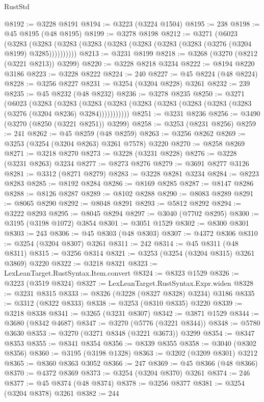 \begin{lexlean}{RustStd}
\begin{coremodule}
@8192 := @3228 @8191
@8194 := @3223 (@3224 @1504)
@8195 := 238
@8198 := @45 @8195 (@48 @8195)
@8199 := @3278 @8198
@8212 := @3271
    (@6023
      (@3283 (@3283 (@3283 (@3283 (@3283 (@3283 (@3283 (@3283 (@3276 (@3204 @8199) @3285))))))))))
@8213 := @3231 @8199
@8218 := @3268 (@3270 (@8212 (@3221 @8213)) @3299)
@8220 := @3228 @8218 @3234
@8222 := @8194 @8220 @3186
@8223 := @3228 @8222
@8224 := 240
@8227 := @45 @8224 (@48 @8224)
@8228 := @3256 @8227
@8231 := @3254 (@3204 @8228) @3261
@8232 := 239
@8235 := @45 @8232 (@48 @8232)
@8236 := @3278 @8235
@8250 := @3271
    (@6023
      (@3283
        (@3283
          (@3283 (@3283 (@3283 (@3283 (@3283 (@3283 (@3283 (@3276 (@3204 @8236) @3284)))))))))))
@8251 := @3231 @8236
@8256 := @3490 (@3270 (@8250 (@3221 @8251)) @3299)
@8258 := @3253 (@8231 @8256)
@8259 := 241
@8262 := @45 @8259 (@48 @8259)
@8263 := @3256 @8262
@8269 := @3253 (@3254 (@3204 @8263) @3261 @7578) @3220
@8270 := @8258 @8269
@8271 := @3218 @8270
@8273 := @3228 (@3231 @8228)
@8276 := @3228 (@3231 @8263) @3234
@8277 := @8273 @8276
@8279 := @3691 @8277 @3126
@8281 := @3312 (@8271 @8279)
@8283 := @3228 @8281 @3234
@8284 := @8223 @8283
@8285 := @8192 @8284
@8286 := @8169 @8285
@8287 := @8147 @8286
@8288 := @8126 @8287
@8289 := @8102 @8288
@8290 := @8083 @8289
@8291 := @8065 @8290
@8292 := @8048 @8291
@8293 := @5812 @8292
@8294 := @3222 @8293
@8295 := @8045 @8294
@8297 := @3040 (@7702 @8295)
@8300 := @3195 (@3198 @1072) @3854
@8301 := @3051 @1529
@8302 := @8300 @8301
@8303 := 243
@8306 := @45 @8303 (@48 @8303)
@8307 := @4372 @8306
@8310 := @3254 (@3204 @8307) @3261
@8311 := 242
@8314 := @45 @8311 (@48 @8311)
@8315 := @3256 @8314
@8321 := @3253 (@3254 (@3204 @8315) @3261 @3869) @3220
@8322 := @3218 @8321
@8323 := LexLeanTarget.RustSyntax.Item.convert
@8324 := @8323 @1529
@8326 := @3223 (@3519 @8324)
@8327 := LexLeanTarget.RustSyntax.Expr.widen
@8328 := @3231 @8315
@8333 := @8326 (@3228 (@8327 @8328) @3234) @3186
@8335 := @3312 (@8322 @8333)
@8338 := @3253 (@8310 @8335) @3220
@8339 := @3218 @8338
@8341 := @3265 (@3231 @8307)
@8342 := @3871 @1529
@8344 := @3680 (@8342 @4687)
@8347 := @3270 (@5776 (@3221 @8344))
@8348 := @5780 @3630
@8353 := @3270 (@3271 @8348 (@3221 @3673)) @3299
@8354 := @8347 @8353
@8355 := @8341 @8354
@8356 := @8339 @8355
@8358 := @3040 (@8302 @8356)
@8360 := @3195 (@3198 @1328)
@8363 := @3202 (@3209 @8301) @3212
@8365 := @8360 @8363 @3052
@8366 := 247
@8369 := @45 @8366 (@48 @8366)
@8370 := @4372 @8369
@8373 := @3254 (@3204 @8370) @3261
@8374 := 246
@8377 := @45 @8374 (@48 @8374)
@8378 := @3256 @8377
@8381 := @3254 (@3204 @8378) @3261
@8382 := 244

\end{coremodule}
\end{lexlean}
